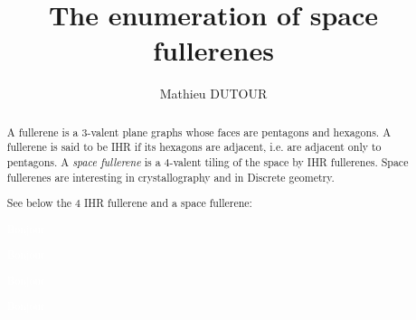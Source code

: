 \documentclass[12pt]{article}
\title{The enumeration of space fullerenes}
\author{Mathieu DUTOUR}
\begin{document}
\newcommand{\R}{\ensuremath{\mathbb{R}}}
\newcommand{\N}{\ensuremath{\mathbb{N}}}
\newcommand{\Q}{\ensuremath{\mathbb{Q}}}
\newcommand{\C}{\ensuremath{\mathbb{C}}}
\newcommand{\Z}{\ensuremath{\mathbb{Z}}}
\newcommand{\T}{\ensuremath{\mathbb{T}}}
\newtheorem{proposition}{Proposition}
\newtheorem{theorem}{Theorem}
\newtheorem{corollary}{Corollary}
\newtheorem{lemma}{Lemma}
\newtheorem{problem}{Problem}
\newtheorem{conjecture}{Conjecture}
\newtheorem{claim}{Claim}
\newtheorem{remark}{Remark}
\newtheorem{definition}{Definition}
\newcommand{\qed}{\hfill $\Box$ }
\newcommand{\proof}{\noindent{\bf Proof.}\ \ }

\maketitle


\begin{abstract}
A fullerene is a $3$-valent plane graphs whose faces are pentagons and
hexagons.
A fullerene is said to be IHR if its hexagons are adjacent, i.e. are
adjacent only to pentagons. A {\em space fullerene} is a $4$-valent
tiling of the space by IHR fullerenes. Space fullerenes are interesting
in crystallography and in Discrete geometry.


See below the $4$ IHR fullerene and a space fullerene:
\begin{center}
\begin{minipage}{5.5cm}
\begin{minipage}{25mm}
\centering
\epsfxsize=16mm
\par
\textcolor{white}{Bonjour}
\end{minipage}
\hfill\begin{minipage}{25mm}
\centering
\epsfxsize=16mm
\par
\textcolor{white}{Bonjour}
\end{minipage}
\begin{minipage}{25mm}
\centering
\epsfxsize=16mm
\par
\textcolor{white}{Bonjour}
\end{minipage}
\hfill\begin{minipage}{25mm}
\centering
\epsfxsize=16mm
\par
\textcolor{white}{Bonjour}
\end{minipage}
\end{minipage}
\begin{minipage}{6.5cm}
\centering
{}\par
\end{minipage}
\end{center}


\end{abstract}
\end{document}
